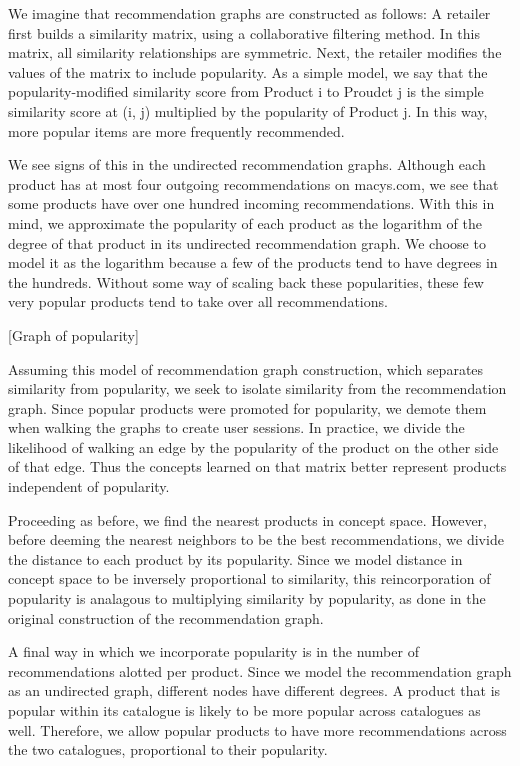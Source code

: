 \documentclass[11pt]{article}
\begin{document}
We imagine that recommendation graphs are constructed as follows: A retailer first
builds a similarity matrix, using a collaborative filtering method. In this
matrix, all similarity relationships are symmetric. Next, the retailer modifies
the values of the matrix to include popularity. As a simple model, we say that
the popularity-modified similarity score from Product i to Proudct j is the
simple similarity score at (i, j) multiplied by the popularity of Product j. In
this way, more popular items are more frequently recommended. 

We see signs of this in the undirected recommendation graphs. Although each product
has at most four outgoing recommendations on macys.com, we see that some
products have over one hundred incoming recommendations. With this in mind, we
approximate the popularity of each product as the logarithm of the degree of
that product in its undirected recommendation graph. We choose to model it as the
logarithm because a few of the products tend to have degrees in the hundreds.
Without some way of scaling back these popularities, these few very popular
products tend to take over all recommendations.

[Graph of popularity]

Assuming this model of recommendation graph construction, which separates similarity
from popularity, we seek to isolate similarity from the recommendation graph. Since
popular products were promoted for popularity, we demote them when walking the
graphs to create user sessions. In practice, we divide the likelihood of walking
an edge by the popularity of the product on the other side of that edge. Thus
the concepts learned on that matrix better represent products independent of
popularity. 

Proceeding as before, we find the nearest products in concept space. However,
before deeming the nearest neighbors to be the best recommendations, we divide
the distance to each product by its popularity. Since we model distance in 
concept space to be inversely proportional to similarity, this reincorporation
of popularity is analagous to multiplying similarity by popularity, as done in
the original construction of the recommendation graph.

A final way in which we incorporate popularity is in the number of
recommendations alotted per product. Since we model the recommendation graph as an
undirected graph, different nodes have different degrees. A product that is
popular within its catalogue is likely to be more popular across catalogues as
well. Therefore, we allow popular products to have more recommendations across
the two catalogues, proportional to their popularity.
\end{document}
